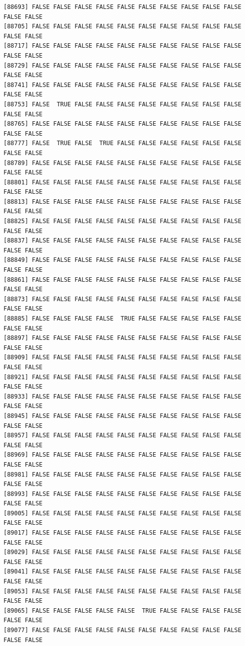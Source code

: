\documentclass[
  a4paper,
  DIV=11,
  numbers=noendperiod]{scrartcl}
\begin{document}
\begin{verbatim}
[88693] FALSE FALSE FALSE FALSE FALSE FALSE FALSE FALSE FALSE FALSE FALSE FALSE
[88705] FALSE FALSE FALSE FALSE FALSE FALSE FALSE FALSE FALSE FALSE FALSE FALSE
[88717] FALSE FALSE FALSE FALSE FALSE FALSE FALSE FALSE FALSE FALSE FALSE FALSE
[88729] FALSE FALSE FALSE FALSE FALSE FALSE FALSE FALSE FALSE FALSE FALSE FALSE
[88741] FALSE FALSE FALSE FALSE FALSE FALSE FALSE FALSE FALSE FALSE FALSE FALSE
[88753] FALSE  TRUE FALSE FALSE FALSE FALSE FALSE FALSE FALSE FALSE FALSE FALSE
[88765] FALSE FALSE FALSE FALSE FALSE FALSE FALSE FALSE FALSE FALSE FALSE FALSE
[88777] FALSE  TRUE FALSE  TRUE FALSE FALSE FALSE FALSE FALSE FALSE FALSE FALSE
[88789] FALSE FALSE FALSE FALSE FALSE FALSE FALSE FALSE FALSE FALSE FALSE FALSE
[88801] FALSE FALSE FALSE FALSE FALSE FALSE FALSE FALSE FALSE FALSE FALSE FALSE
[88813] FALSE FALSE FALSE FALSE FALSE FALSE FALSE FALSE FALSE FALSE FALSE FALSE
[88825] FALSE FALSE FALSE FALSE FALSE FALSE FALSE FALSE FALSE FALSE FALSE FALSE
[88837] FALSE FALSE FALSE FALSE FALSE FALSE FALSE FALSE FALSE FALSE FALSE FALSE
[88849] FALSE FALSE FALSE FALSE FALSE FALSE FALSE FALSE FALSE FALSE FALSE FALSE
[88861] FALSE FALSE FALSE FALSE FALSE FALSE FALSE FALSE FALSE FALSE FALSE FALSE
[88873] FALSE FALSE FALSE FALSE FALSE FALSE FALSE FALSE FALSE FALSE FALSE FALSE
[88885] FALSE FALSE FALSE FALSE  TRUE FALSE FALSE FALSE FALSE FALSE FALSE FALSE
[88897] FALSE FALSE FALSE FALSE FALSE FALSE FALSE FALSE FALSE FALSE FALSE FALSE
[88909] FALSE FALSE FALSE FALSE FALSE FALSE FALSE FALSE FALSE FALSE FALSE FALSE
[88921] FALSE FALSE FALSE FALSE FALSE FALSE FALSE FALSE FALSE FALSE FALSE FALSE
[88933] FALSE FALSE FALSE FALSE FALSE FALSE FALSE FALSE FALSE FALSE FALSE FALSE
[88945] FALSE FALSE FALSE FALSE FALSE FALSE FALSE FALSE FALSE FALSE FALSE FALSE
[88957] FALSE FALSE FALSE FALSE FALSE FALSE FALSE FALSE FALSE FALSE FALSE FALSE
[88969] FALSE FALSE FALSE FALSE FALSE FALSE FALSE FALSE FALSE FALSE FALSE FALSE
[88981] FALSE FALSE FALSE FALSE FALSE FALSE FALSE FALSE FALSE FALSE FALSE FALSE
[88993] FALSE FALSE FALSE FALSE FALSE FALSE FALSE FALSE FALSE FALSE FALSE FALSE
[89005] FALSE FALSE FALSE FALSE FALSE FALSE FALSE FALSE FALSE FALSE FALSE FALSE
[89017] FALSE FALSE FALSE FALSE FALSE FALSE FALSE FALSE FALSE FALSE FALSE FALSE
[89029] FALSE FALSE FALSE FALSE FALSE FALSE FALSE FALSE FALSE FALSE FALSE FALSE
[89041] FALSE FALSE FALSE FALSE FALSE FALSE FALSE FALSE FALSE FALSE FALSE FALSE
[89053] FALSE FALSE FALSE FALSE FALSE FALSE FALSE FALSE FALSE FALSE FALSE FALSE
[89065] FALSE FALSE FALSE FALSE FALSE  TRUE FALSE FALSE FALSE FALSE FALSE FALSE
[89077] FALSE FALSE FALSE FALSE FALSE FALSE FALSE FALSE FALSE FALSE FALSE FALSE

\end{verbatim}
\end{document}
